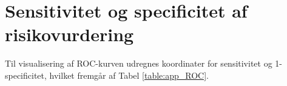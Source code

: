 
\newpage
\section{Sensitivitet og specificitet af risikovurdering} \label{App:ROC}
Til visualisering af ROC-kurven udregnes koordinater for sensitivitet og 1-specificitet, hvilket fremgår af Tabel  \ref{table:app_ROC}.

